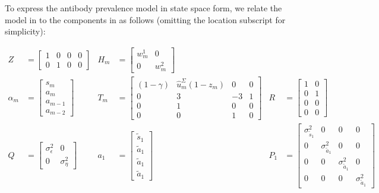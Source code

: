 
To express the antibody prevalence model in state space form, we relate the
model in  to the components in
 as follows (omitting the location subscript for
simplicity):
\begin{linenomath*}
\begin{align}
    Z &= \begin{bmatrix} 1 & 0 & 0 & 0 \\ 0 & 1 & 0 & 0 \end{bmatrix} &
    H_m &= \begin{bmatrix}w^1_{m} & 0 \\ 0 & w^2_{m} \end{bmatrix} \\
    \alpha_m &= \begin{bmatrix}s_{m} \\ a_m \\ a_{m-1}\\ a_{m-2} \end{bmatrix} & 
    T_m &= \begin{bmatrix}(1 - \gamma) & \widehat{u}^\Sigma_{m} (1 - z_m) & 0 & 0\\ 
        0 & 3 & -3 & 1 \\ 0 & 1 & 0 & 0\\ 0 & 0 & 1 & 0 \end{bmatrix}  & 
    R &= \begin{bmatrix}1 & 0  \\ 0 & 1 \\ 0 & 0 \\ 0 & 0 \end{bmatrix}\\
    Q &= \begin{bmatrix} \sigma^2_\epsilon & 0  \\ 0 & \sigma^2_\eta \end{bmatrix} &
    a_1 &= \begin{bmatrix} \tilde{s}_{1}\\ \tilde{a}_1\\ \tilde{a}_1 \\ \tilde{a}_1 \end{bmatrix} & 
    P_{1} &= \begin{bmatrix} \sigma^2_{\tilde{s}_{1}} & 0 & 0 & 0 \\ 
    0 & \sigma^2_{\tilde{a}_1} & 0 & 0\\ 0 & 0 & \sigma^2_{\tilde{a}_1} & 0 \\ 
    0 & 0 & 0 & \sigma^2_{\tilde{a}_1} \end{bmatrix} 
\end{align}
\end{linenomath*}
